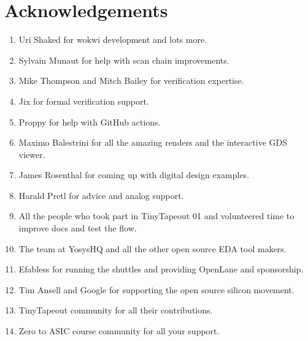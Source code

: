 \section{Acknowledgements}
\label{sec:acknowledgements}

\begin{enumerate}
    \item Uri Shaked for wokwi development and lots more.
    \item Sylvain Munaut for help with scan chain improvements.
    \item Mike Thompson and Mitch Bailey for verification expertise.
    \item Jix for formal verification support.
    \item Proppy for help with GitHub actions.
    \item Maximo Balestrini for all the amazing renders and the interactive GDS viewer.
    \item James Rosenthal for coming up with digital design examples.
    \item Harald Pretl for advice and analog support.
    \item All the people who took part in TinyTapeout 01 and volunteered time to improve docs and test the flow.
    \item The team at YosysHQ and all the other open source EDA tool makers.
    \item Efabless for running the shuttles and providing OpenLane and sponsorship.
    \item Tim Ansell and Google for supporting the open source silicon movement.
    \item TinyTapeout community for all their contributions.
    \item Zero to ASIC course community for all your support.
\end{enumerate}
